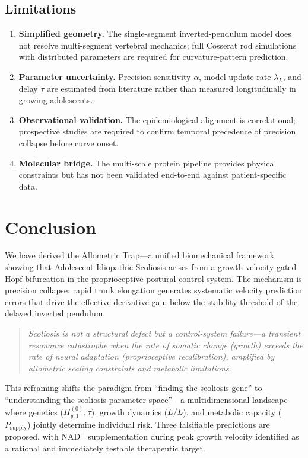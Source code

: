 \documentclass[12pt, letterpaper]{article}
\newcommand{\Piy}{\Pi_{y,1}}
\begin{document}
\subsection{Limitations}

\begin{enumerate}[label=\arabic*.]
  \item \textbf{Simplified geometry.} The single-segment inverted-pendulum model
    does not resolve multi-segment vertebral mechanics; full Cosserat rod
    simulations with distributed parameters are required for curvature-pattern
    prediction.
  \item \textbf{Parameter uncertainty.} Precision sensitivity $\alpha$, model
    update rate $\lambda_L$, and delay $\tau$ are estimated from literature
    rather than measured longitudinally in growing adolescents.
  \item \textbf{Observational validation.} The epidemiological alignment is
    correlational; prospective studies are required to confirm temporal
    precedence of precision collapse before curve onset.
  \item \textbf{Molecular bridge.} The multi-scale protein pipeline provides
    physical constraints but has not been validated end-to-end against
    patient-specific data.
\end{enumerate}

\section{Conclusion}

We have derived the Allometric Trap---a unified biomechanical framework showing
that Adolescent Idiopathic Scoliosis arises from a growth-velocity-gated Hopf
bifurcation in the proprioceptive postural control system. The mechanism is
precision collapse: rapid trunk elongation generates systematic velocity
prediction errors that drive the effective derivative gain below the stability
threshold of the delayed inverted pendulum.

\begin{quote}
  \textit{Scoliosis is not a structural defect but a control-system
  failure---a transient resonance catastrophe when the rate of somatic change
  (growth) exceeds the rate of neural adaptation (proprioceptive
  recalibration), amplified by allometric scaling constraints and metabolic
  limitations.}
\end{quote}

This reframing shifts the paradigm from ``finding the scoliosis gene'' to
``understanding the scoliosis parameter space''---a multidimensional landscape
where genetics ($\Piy^{(0)},\tau$), growth dynamics ($\dot{L}/L$), and
metabolic capacity ($P_{\mathrm{supply}}$) jointly determine individual risk.
Three falsifiable predictions are proposed, with NAD$^{+}$ supplementation
during peak growth velocity identified as a rational and immediately testable
therapeutic target.
\end{document}
